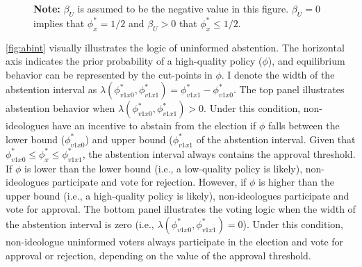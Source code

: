 \documentclass[letterpaper, 12pt]{article}
\newcommand{\floatnote}[1]{\vspace{\abovecaptionskip}\caption*{\textbf{Note:} #1}\vspace{-\abovecaptionskip}}
\begin{document}
\begin{figure}[t!]
\begin{center}
        \end{center}
        \floatnote{$\beta_U$ is assumed to be the negative value in this figure. $\beta_U=0$ implies that $\phi^*_x=1/2$ and $\beta_U>0$ that $\phi^*_x \leq 1/2$.}
    \end{figure}
    
    \par \autoref{fig:abint} visually illustrates the logic of uninformed abstention. The horizontal axis indicates the prior probability of a high-quality policy ($\phi$), and equilibrium behavior can be represented by the cut-points in $\phi$. I denote the width of the abstention interval as $\lambda(\phi^*_{v1x0},  \phi^*_{v1x1}) = \phi^*_{v1x1} - \phi^*_{v1x0}$. The top panel illustrates abstention behavior when $\lambda(\phi^*_{v1x0},  \phi^*_{v1x1}) > 0$. Under this condition, non-ideologues have an incentive to abstain from the election if $\phi$ falls between the lower bound ($\phi^*_{v1x0}$) and upper bound ($\phi^*_{v1x1}$ of the abstention interval. Given that $\phi^*_{v1x0} \leq  \phi^*_x \leq  \phi^*_{v1x1}$, the abstention interval always contains the approval threshold. If $\phi$ is lower than the lower bound (i.e., a low-quality policy is likely), non-ideologues participate and vote for rejection. However, if $\phi$ is higher than the upper bound (i.e., a high-quality policy is likely), non-ideologues participate and vote for approval. The bottom panel illustrates the voting logic when the width of the abstention interval is zero (i.e., $\lambda(\phi^*_{v1x0},  \phi^*_{v1x1}) =0$). Under this condition, non-ideologue uninformed voters always participate in the election and vote for approval or rejection, depending on the value of the approval threshold. 
    
\end{document}
